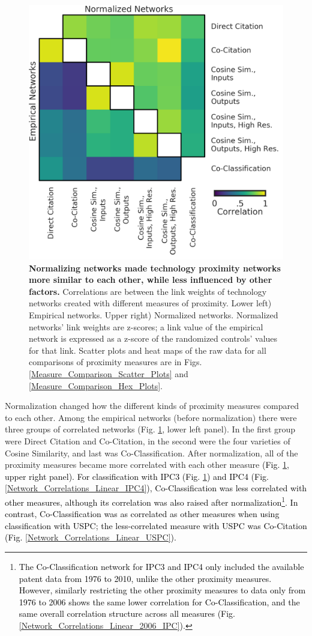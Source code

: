 \documentclass[]{svjour3}
\begin{document}
\begin{figure}[ht!]
\begin{center}
\includegraphics[width=.7\textwidth]{figs/Network_Correlations_Linear_IPC.png}
\end{center}
\caption{\textbf{Normalizing networks made technology proximity networks more similar to each other, while less influenced by other factors.} Correlations are between the link weights of technology networks created with different measures of proximity. 
Lower left) Empirical networks.
Upper right) Normalized networks. Normalized networks' link weights are z-scores; a link value of the empirical network is expressed as a z-score of the randomized controls' values for that link. Scatter plots and heat maps of the raw data for all comparisons of proximity measures are in Figs. \ref{Measure_Comparison_Scatter_Plots} and \ref{Measure_Comparison_Hex_Plots}.
}\label{measure_correlations}
\end{figure}


Normalization changed how the different kinds of proximity measures compared to each other. Among the empirical networks (before normalization) there were three groups of correlated networks (Fig. \ref{measure_correlations}, lower left panel). In the first group were Direct Citation and Co-Citation, in the second were the four varieties of Cosine Similarity, and last was Co\hyp{}Classification.
After normalization, all of the proximity measures became more correlated with each other measure \textcolor{black}{(Fig. \ref{measure_correlations}, upper right panel). For classification with IPC3 (Fig. \ref{measure_correlations}) and IPC4 (Fig. \ref{Network_Correlations_Linear_IPC4}), Co-Classification was less correlated with other measures, although its correlation was also raised after normalization\footnote{\textcolor{black}{The Co-Classification network for IPC3 and IPC4 only included the available patent data from 1976 to 2010, unlike the other proximity measures. However, similarly restricting the other proximity measures to data only from 1976 to 2006 shows the same lower correlation for Co-Classification, and the same overall correlation structure across all measures (Fig. \ref{Network_Correlations_Linear_2006_IPC}).}}. In contrast, Co-Classification was as correlated as other measures when using classification with USPC; the less-correlated measure with USPC was Co-Citation (Fig. \ref{Network_Correlations_Linear_USPC}).}
\end{document}
